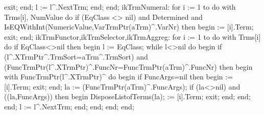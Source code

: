                  exit;
               end;
               l := l^.NextTrm;
            end;
         end;
      ikTrmNumeral:
         for i := 1 to  do
            with Trms[i], NumValue do
               if (EqClass <> nil) and Determined and
                     IsEQWithInt(NumericValue,VarTrmPtr(aTrm)^.VarNr) then
               begin
                   := [i].Term;
                  exit;
               end;
      ikTrmFunctor,ikTrmSelector,ikTrmAggreg:
         for i := 1 to  do
            with Trms[i] do
               if EqClass<>nil then
               begin
                  l := EqClass;
                  while l<>nil do
                  begin
                     if (l^.XTrmPtr^.TrmSort=aTrm^.TrmSort) and (FuncTrmPtr(l^.XTrmPtr)^.FuncNr=FuncTrmPtr(aTrm)^.FuncNr) then
                     begin
                        with FuncTrmPtr(l^.XTrmPtr)^ do
                        begin
                           if FuncArgs=nil then
                           begin
                               := [i].Term;
                              exit;
                           end;
                           la := (FuncTrmPtr(aTrm)^.FuncArgs);
                           if (la<>nil) and ((la,FuncArgs)) then
                           begin
                              DisposeListofTerms(la);
                               := [i].Term;
                              exit;
                           end;
                        end;
                     end;
                     l := l^.NextTrm;
                  end;
               end;
   end;
end;
\eatline
{}\nwendcode{}\nwdocspar
